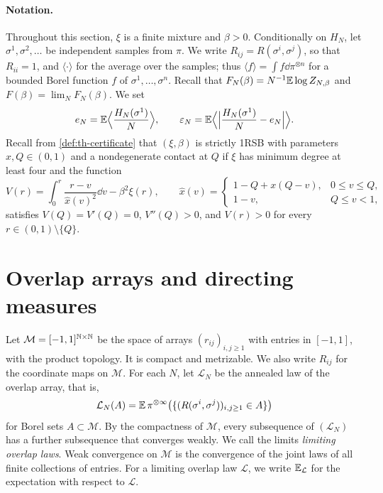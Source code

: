 \paragraph{Notation.} Throughout this section, $\xi$ is a finite mixture and $\beta>0$. Conditionally on $H_N$, let $\sigma^1,\sigma^2,\dots$ be independent samples from $\pi$. We write $R_{ij}=R(\sigma^i,\sigma^j)$, so that $R_{ii}=1$, and $\langle\cdot\rangle$ for the average over the samples; thus $\langle f\rangle=\int f\dd\pi^{\otimes n}$ for a bounded Borel function $f$ of $\sigma^1,\dots,\sigma^n$. Recall that $F_N(\beta)=N^{-1}\mathbb E\log Z_{N,\beta}$ and $F(\beta)=\lim_NF_N(\beta)$. We set
\begin{equation}\label{eq:dir-energy}
e_N=\mathbb E\Big\langle\frac{H_N(\sigma^1)}N\Big\rangle,\qquad\varepsilon_N=\mathbb E\Big\langle\Big|\frac{H_N(\sigma^1)}N-e_N\Big|\Big\rangle.
\end{equation}
Recall from \cref{def:th-certificate} that $(\xi,\beta)$ is strictly 1RSB with parameters $x,Q\in(0,1)$ and a nondegenerate contact at $Q$ if $\xi$ has minimum degree at least four and the function
\[
V(r)=\int_0^r\frac{r-v}{\hat x(v)^2}\dd v-\beta^2\xi(r),\qquad\hat x(v)=\begin{cases}1-Q+x(Q-v),&0\le v\le Q,\\1-v,&Q\le v<1,\end{cases}
\]
satisfies $V(Q)=V'(Q)=0$, $V''(Q)>0$, and $V(r)>0$ for every $r\in(0,1)\setminus\{Q\}$.

\section{Overlap arrays and directing measures}\label{sec:dir-arrays}

Let $\mathcal M=[-1,1]^{\mathbb N\times\mathbb N}$ be the space of arrays $(r_{ij})_{i,j\ge1}$ with entries in $[-1,1]$, with the product topology. It is compact and metrizable. We also write $R_{ij}$ for the coordinate maps on $\mathcal M$. For each $N$, let $\mathcal L_N$ be the annealed law of the overlap array, that is,
\[
\mathcal L_N(A)=\mathbb E\,\pi^{\otimes\infty}\big(\{(R(\sigma^i,\sigma^j))_{i,j\ge1}\in A\}\big)
\]
for Borel sets $A\subset\mathcal M$. By the compactness of $\mathcal M$, every subsequence of $(\mathcal L_N)$ has a further subsequence that converges weakly. We call the limits \emph{limiting overlap laws}. Weak convergence on $\mathcal M$ is the convergence of the joint laws of all finite collections of entries. For a limiting overlap law $\mathcal L$, we write $\mathbb E_{\mathcal L}$ for the expectation with respect to $\mathcal L$.


